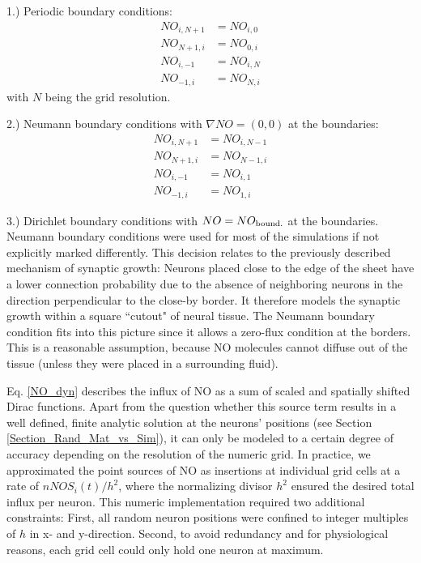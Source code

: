 \documentclass[10pt,letterpaper]{article}
\begin{document}
1.) Periodic boundary conditions:
\begin{align}
NO_{i,N+1} &= NO_{i,0} \label{Periodic_Cond_1} \\
NO_{N+1,i} &= NO_{0,i} \label{Periodic_Cond_2} \\
NO_{i,-1} &= NO_{i,N} \label{Periodic_Cond_3} \\
NO_{-1,i} &= NO_{N,i} \label{Periodic_Cond_4}
\end{align}
with $N$ being the grid resolution.

2.) Neumann boundary conditions with $\nabla NO = (0,0)$ at the boundaries:
\begin{align}
NO_{i,N+1} &= NO_{i,N-1} \label{Neumann_Cond_1} \\
NO_{N+1,i} &= NO_{N-1,i} \label{Neumann_Cond_2} \\
NO_{i,-1} &= NO_{i,1} \label{Neumann_Cond_3} \\
NO_{-1,i} &= NO_{1,i} \label{Neumann_Cond_4}
\end{align}

3.) Dirichlet boundary conditions with $NO = NO_{\rm bound.}$ at the boundaries.\\
Neumann boundary conditions were used for most of the simulations if not explicitly marked differently. This decision relates to the previously described mechanism of synaptic growth: Neurons placed close to the edge of the sheet have a lower connection probability due to the absence of neighboring neurons in the direction perpendicular to the close-by border. It therefore models the synaptic growth within a square ``cutout" of neural tissue. The Neumann boundary condition fits into this picture since it allows a zero-flux condition at the borders. This is a reasonable assumption, because NO molecules cannot diffuse out of the tissue (unless they were placed in a surrounding fluid).

Eq. \eqref{NO_dyn} describes the influx of NO as a sum of scaled and spatially shifted Dirac functions. Apart from the question whether this source term results in a well defined, finite analytic solution at the neurons' positions (see Section \ref{Section_Rand_Mat_vs_Sim}), it can only be modeled to a certain degree of accuracy depending on the resolution of the numeric grid. In practice, we approximated the point sources of NO as insertions at individual grid cells at a rate of $nNOS_i(t) / h^2$, where the normalizing divisor $h^2$ ensured the desired total influx per neuron. This numeric implementation required two additional constraints: First, all random neuron positions were confined to integer multiples of $h$ in x- and y-direction. Second, to avoid redundancy and for physiological reasons, each grid cell could only hold one neuron at maximum.
\end{document}
